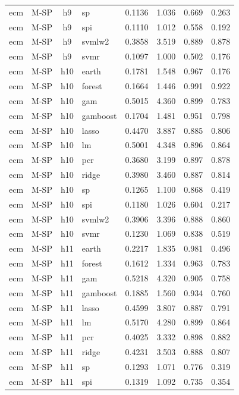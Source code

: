 \begin{ThreePartTable}
\begin{longtable}[t]{llclcccc}
ecm & M-SP & h9 & sp & 0.1136 & 1.036 & 0.669 & 0.263\\
ecm & M-SP & h9 & spi & 0.1110 & 1.012 & 0.558 & 0.192\\
ecm & M-SP & h9 & svmlw2 & 0.3858 & 3.519 & 0.889 & 0.878\\
ecm & M-SP & h9 & svmr & 0.1097 & 1.000 & 0.502 & 0.176\\
\addlinespace
ecm & M-SP & h10 & earth & 0.1781 & 1.548 & 0.967 & 0.176\\
ecm & M-SP & h10 & forest & 0.1664 & 1.446 & 0.991 & 0.922\\
ecm & M-SP & h10 & gam & 0.5015 & 4.360 & 0.899 & 0.783\\
ecm & M-SP & h10 & gamboost & 0.1704 & 1.481 & 0.951 & 0.798\\
ecm & M-SP & h10 & lasso & 0.4470 & 3.887 & 0.885 & 0.806\\
ecm & M-SP & h10 & lm & 0.5001 & 4.348 & 0.896 & 0.864\\
ecm & M-SP & h10 & pcr & 0.3680 & 3.199 & 0.897 & 0.878\\
ecm & M-SP & h10 & ridge & 0.3980 & 3.460 & 0.887 & 0.814\\
ecm & M-SP & h10 & sp & 0.1265 & 1.100 & 0.868 & 0.419\\
ecm & M-SP & h10 & spi & 0.1180 & 1.026 & 0.604 & 0.217\\
ecm & M-SP & h10 & svmlw2 & 0.3906 & 3.396 & 0.888 & 0.860\\
ecm & M-SP & h10 & svmr & 0.1230 & 1.069 & 0.838 & 0.519\\
\addlinespace
ecm & M-SP & h11 & earth & 0.2217 & 1.835 & 0.981 & 0.496\\
ecm & M-SP & h11 & forest & 0.1612 & 1.334 & 0.963 & 0.783\\
ecm & M-SP & h11 & gam & 0.5218 & 4.320 & 0.905 & 0.758\\
ecm & M-SP & h11 & gamboost & 0.1885 & 1.560 & 0.934 & 0.760\\
ecm & M-SP & h11 & lasso & 0.4599 & 3.807 & 0.887 & 0.791\\
ecm & M-SP & h11 & lm & 0.5170 & 4.280 & 0.899 & 0.864\\
ecm & M-SP & h11 & pcr & 0.4025 & 3.332 & 0.898 & 0.882\\
ecm & M-SP & h11 & ridge & 0.4231 & 3.503 & 0.888 & 0.807\\
ecm & M-SP & h11 & sp & 0.1293 & 1.071 & 0.776 & 0.319\\
ecm & M-SP & h11 & spi & 0.1319 & 1.092 & 0.735 & 0.354\\

\end{longtable}
\end{ThreePartTable}
